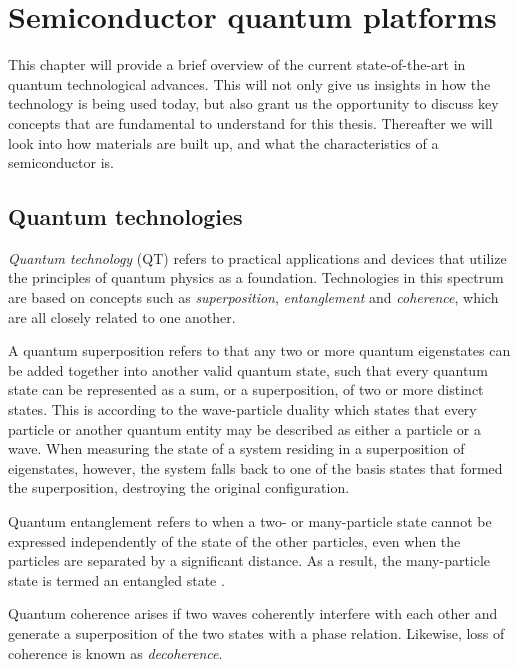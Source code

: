 \chapter{Semiconductor quantum platforms}

This chapter will provide a brief overview of the current state-of-the-art in quantum technological advances. This will not only give us insights in how the technology is being used today, but also grant us the opportunity to discuss key concepts that are fundamental to understand for this thesis. Thereafter we will look into how materials are built up, and what the characteristics of a semiconductor is.

\section{Quantum technologies}

\textit{Quantum technology} (QT) refers to practical applications and devices that utilize the principles of quantum physics as a foundation. Technologies in this spectrum are based on concepts such as \textit{superposition}, \textit{entanglement} and \textit{coherence}, which are all closely related to one another.

A quantum superposition refers to that any two or more quantum eigenstates can be added together into another valid quantum state, such that every quantum state can be represented as a sum, or a superposition, of two or more distinct states. This is according to the wave-particle duality which states that every particle or another quantum entity may be described as either a particle or a wave. When measuring the state of a system residing in a superposition of eigenstates, however, the system falls back to one of the basis states that formed the superposition, destroying the original configuration.

Quantum entanglement refers to when a two- or many-particle state cannot be expressed independently of the state of the other particles, even when the particles are separated by a significant distance. As a result, the many-particle state is termed an entangled state \cite{Griffiths2017}.

Quantum coherence arises if two waves coherently interfere with each other and generate a superposition of the two states with a phase relation. Likewise, loss of coherence is known as \textit{decoherence}.

